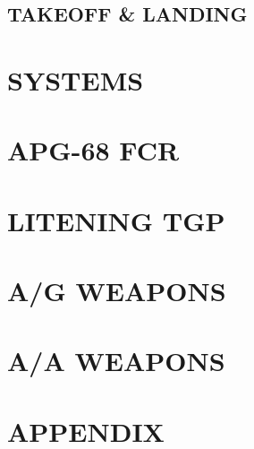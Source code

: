 \documentclass[fontInter]{TechCheck}
\begin{document}
	\clearpage
	
	\section{TAKEOFF \& LANDING}

	

	\cleardoublepage

	\chapter{SYSTEMS}
	\minitoc
	\cleardoublepage

	\cleardoublepage

	\chapter{APG-68 FCR}
	\minitoc
	\cleardoublepage

	\cleardoublepage

	\chapter{LITENING TGP}
	\minitoc
	\cleardoublepage

	\cleardoublepage

	\chapter{A/G WEAPONS}
	\minitoc
	\cleardoublepage

	\cleardoublepage

	\chapter{A/A WEAPONS}
	\minitoc
	\cleardoublepage

	\chapter{APPENDIX}
	\minitoc
	\cleardoublepage


  \cleardoublepage

\iftoggle{print}{
	\pagestyle{empty}
	\newpage \null
	\thumbwide
	\newpage \null
}{}
\end{document}
